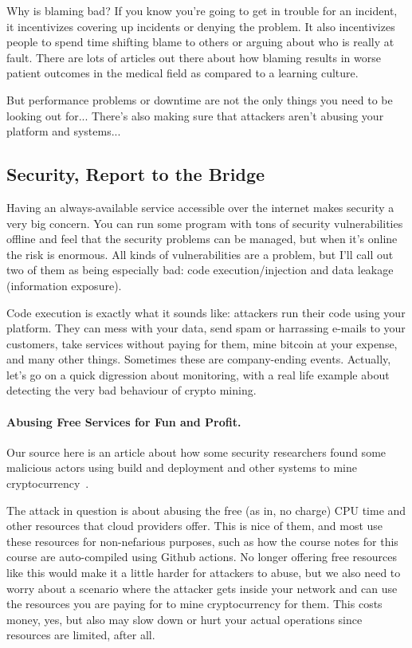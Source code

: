 \documentclass[a4paper]{report}
\begin{document}
Why is blaming bad? If you know you're going to get in trouble for an incident, it incentivizes covering up incidents or denying the problem. It also incentivizes people to spend time shifting blame to others or arguing about who is really at fault. There are lots of articles out there about how blaming results in worse patient outcomes in the medical field as compared to a learning culture.

But performance problems or downtime are not the only things you need to be looking out for... There's also making sure that attackers aren't abusing your platform and systems...

\subsection*{Security, Report to the Bridge}
Having an always-available service accessible over the internet makes security a very big concern. You can run some program with tons of security vulnerabilities offline and feel that the security problems can be managed, but when it's online the risk is enormous. All kinds of vulnerabilities are a problem, but I'll call out two of them as being especially bad: code execution/injection and data leakage (information exposure). 

Code execution is exactly what it sounds like: attackers run their code using your platform. They can mess with your data, send spam or harrassing e-mails to your customers, take services without paying for them, mine bitcoin at your expense, and many other things. Sometimes these are company-ending events. Actually, let's go on a quick digression about monitoring, with a real life example about detecting the very bad behaviour of crypto mining.

\paragraph{Abusing Free Services for Fun and Profit.}
Our source here is an article about how some security researchers found some malicious actors using build and deployment and other systems to mine cryptocurrency~\cite{sysdig}.

The attack in question is about abusing the free (as in, no charge) CPU time and other resources that cloud providers offer. This is nice of them, and most use these resources for non-nefarious purposes, such as how the course notes for this course are auto-compiled using Github actions. No longer offering free resources like this would make it a little harder for attackers to abuse, but we also need to worry about a scenario where the attacker gets inside your network and can use the resources you are paying for to mine cryptocurrency for them. This costs money, yes, but also may slow down or hurt your actual operations since resources are limited, after all.
\end{document}
